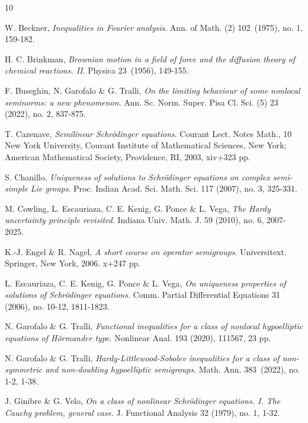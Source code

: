\documentclass[11pt,a4paper]{amsart}
\numberwithin{equation}{section}
\numberwithin{equation}{section}
\begin{document}
\begin{thebibliography}{10}




W. Beckner, \emph{Inequalities in Fourier analysis}. Ann. of Math. (2) 102~(1975), no. 1, 159-182. 




H. C. Brinkman, \emph{Brownian motion in a field of force and the diffusion theory of chemical reactions. II}. Physica 23~(1956), 149-155.

F. Buseghin, N. Garofalo \& G. Tralli, \emph{On the limiting behaviour of some nonlocal seminorms: a new phenomenon}.
Ann. Sc. Norm. Super. Pisa Cl. Sci. (5) 23 (2022), no. 2, 837-875.


 T. Cazenave, \emph{Semilinear Schr\"odinger equations}. Courant Lect. Notes Math., 10
New York University, Courant Institute of Mathematical Sciences, New York; American Mathematical Society, Providence, RI, 2003, xiv+323 pp.

S. Chanillo, \emph{Uniqueness of solutions to Schr\"odinger equations on complex semi-simple Lie groups}.
Proc. Indian Acad. Sci. Math. Sci. 117 (2007), no. 3, 325-331.

M. Cowling, L. Escauriaza, C. E. Kenig, G. Ponce \& L. Vega, \emph{The Hardy uncertainty principle revisited}.
Indiana Univ. Math. J. 59 (2010), no. 6, 2007-2025.




K.-J. Engel \& R. Nagel, \emph{A short course on operator semigroups}. Universitext. Springer, New York, 2006. x+247 pp.


L. Escauriaza, C. E. Kenig, G. Ponce \& L. Vega, \emph{On uniqueness properties of solutions of Schr\"odinger equations}.
Comm. Partial Differential Equations 31 (2006), no. 10-12, 1811-1823.


N. Garofalo \& G. Tralli, \emph{Functional inequalities for a class of nonlocal hypoelliptic equations of H\"ormander type}.
Nonlinear Anal. 193 (2020), 111567, 23 pp.

N. Garofalo \& G. Tralli, \emph{Hardy-Littlewood-Sobolev inequalities for a class of non-symmetric and non-doubling hypoelliptic semigroups}.
Math. Ann. 383~(2022), no. 1-2, 1-38.


J. Ginibre \& G. Velo, \emph{On a class of nonlinear Schr\"odinger equations. I. The Cauchy problem, general case}.
J. Functional Analysis 32 (1979), no. 1, 1-32.


\end{thebibliography}
\end{document}
